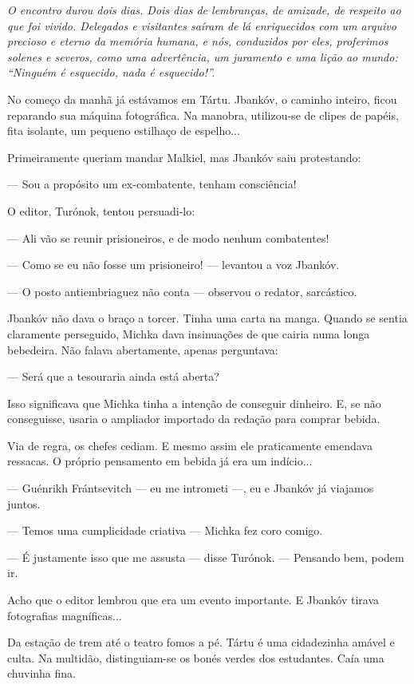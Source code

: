 \emph{O encontro durou dois dias. Dois dias de lembranças, de amizade,
de respeito ao que foi vivido. Delegados e visitantes saíram de lá
enriquecidos com um arquivo precioso e eterno da memória humana, e nós,
conduzidos por eles, proferimos solenes e severos, como uma advertência,
um juramento e uma lição ao mundo: ``Ninguém é esquecido, nada é
esquecido!''.}

No começo da manhã já estávamos em Tártu. Jbankóv, o caminho inteiro,
ficou reparando sua máquina fotográfica. Na manobra, utilizou-se de
clipes de papéis, fita isolante, um pequeno estilhaço de espelho...

Primeiramente queriam mandar Malkiel, mas Jbankóv saiu protestando:

--- Sou a propósito um ex-combatente, tenham consciência!

O editor, Turónok, tentou persuadi-lo:

--- Ali vão se reunir prisioneiros, e de modo nenhum combatentes!

--- Como se eu não fosse um prisioneiro! --- levantou a voz Jbankóv.

--- O posto antiembriaguez não conta --- observou o redator, sarcástico.

Jbankóv não dava o braço a torcer. Tinha uma carta na manga. Quando se
sentia claramente perseguido, Michka dava insinuações de que cairia numa
longa bebedeira. Não falava abertamente, apenas perguntava:

--- Será que a tesouraria ainda está aberta?

Isso significava que Michka tinha a intenção de conseguir dinheiro. E,
se não conseguisse, usaria o ampliador importado da redação para comprar
bebida.

Via de regra, os chefes cediam. E mesmo assim ele praticamente emendava
ressacas. O próprio pensamento em bebida já era um indício...

--- Guénrikh Frántsevitch --- eu me intrometi ---, eu e Jbankóv já
viajamos juntos.

--- Temos uma cumplicidade criativa --- Michka fez coro comigo.

--- É justamente isso que me assusta --- disse Turónok. --- Pensando
bem, podem ir.

Acho que o editor lembrou que era um evento importante. E Jbankóv tirava
fotografias magníficas...

Da estação de trem até o teatro fomos a pé. Tártu é uma cidadezinha
amável e culta. Na multidão, distinguiam-se os bonés verdes dos
estudantes. Caía uma chuvinha fina.

